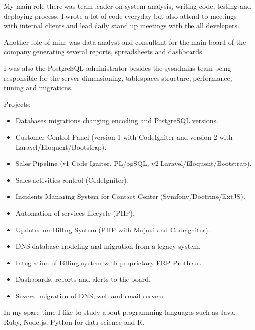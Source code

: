 My main role there was team leader on system analysis, writing code, testing and deploying process. I wrote a lot of code everyday but also attend to meetings with internal clients and lead daily stand up meetings with the all developers.

Another role of mine was data analyst and consultant for the main board of the company generating several reports, spreadsheets and dashboards.

I was also the PostgreSQL administrator besides the sysadmins team being responsible for the server dimensioning, tablespaces structure, performance, tuning and migrations.

Projects:

\begin{itemize}
\item Databases migrations changing encoding and PostgreSQL versions.

\item Customer Control Panel (version 1 with CodeIgniter and version 2 with Laravel\slash Eloquent\slash Bootstrap).

\item Sales Pipeline (v1 Code Igniter, PL\slash pgSQL, v2 Laravel\slash Eloquent\slash Bootstrap).

\item Sales activities control (CodeIgniter).

\item Incidents Managing System for Contact Center (Symfony\slash Doctrine\slash ExtJS).

\item Automation of services lifecycle (PHP).

\item Updates on Billing System (PHP with Mojavi and Codeigniter).

\item DNS database modeling and migration from a legacy system.

\item Integration of Billing system with proprietary ERP Protheus.

\item Dashboards, reports and alerts to the board.

\item Several migration of DNS, web and email servers.

\end{itemize}

In my spare time I like to study about programming languages such as Java, Ruby, Node.js, Python for data science and R.

